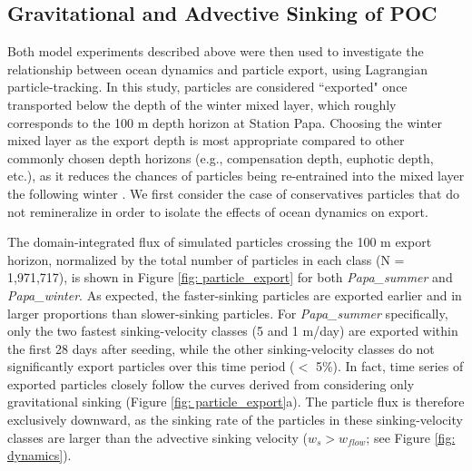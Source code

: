\documentclass[draft,linenumbers]{agujournal2018}
\newcommand{\fixme}[1]{\color{red}$<$\textbf{FIX ME: #1}$>$\color{black}}
\begin{document}
\subsection{Gravitational and Advective Sinking of POC}

Both model experiments described above were then used to investigate the relationship between ocean dynamics and particle export, using Lagrangian particle-tracking. In this study, particles are considered ``exported" once transported below the depth of the winter mixed layer, which roughly corresponds to the 100 m depth horizon at Station Papa. Choosing the winter mixed layer as the export depth is most appropriate compared to other commonly chosen depth horizons (e.g., compensation depth, euphotic depth, etc.), as it reduces the chances of particles being re-entrained into the mixed layer the following winter \citep{Palevsky_2018}. We first consider the case of conservatives particles that do not remineralize in order to isolate the effects of ocean dynamics on export.

The domain-integrated flux of simulated particles crossing the 100 m export horizon, normalized by the total number of particles in each class (N = 1,971,717), is shown in Figure \ref{fig: particle_export} for both \textit{Papa\_summer} and \textit{Papa\_winter}. As expected, the faster-sinking particles are exported earlier and in larger proportions than slower-sinking particles. For \textit{Papa\_summer} specifically, only the two fastest sinking-velocity classes (5 and 1 m/day) are exported within the first 28 days after seeding, while the other sinking-velocity classes do not significantly export particles over this time period ($<$ 5\%). In fact, time series of exported particles closely follow the curves derived from considering only gravitational sinking (Figure \ref{fig: particle_export}a). The particle flux is therefore exclusively downward, as the sinking rate of the particles in these sinking-velocity classes are larger than the advective sinking velocity ($w_s > w_{flow}$; see Figure \ref{fig: dynamics}).

\end{document}
